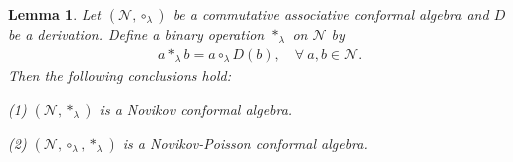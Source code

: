 \documentclass[11pt,letterpaper,reqno]{amsart}
\newtheorem{lemma}[theorem]{Lemma}
\theoremstyle{definition}
\numberwithin{equation}{section}
\begin{document}
\begin{lemma}\label{Lem1.1}
   Let $(\mathcal{N} ,\circ_\lambda)$ be a commutative associative conformal algebra and $D$ be a derivation. Define a binary operation $\ast_\lambda$ on $\mathcal{N}$ by
   \begin{align}
      a\ast_\lambda b=a\circ_\lambda D(b), \quad \forall~a,b \in \mathcal{N}.
   \end{align}
Then the following conclusions hold:

(1) $(\mathcal{N} ,\ast_\lambda)$ is a Novikov conformal algebra.

(2) $(\mathcal{N} ,\circ_\lambda,\ast_\lambda)$ is a Novikov-Poisson conformal algebra.
\end{lemma}
\end{document}
